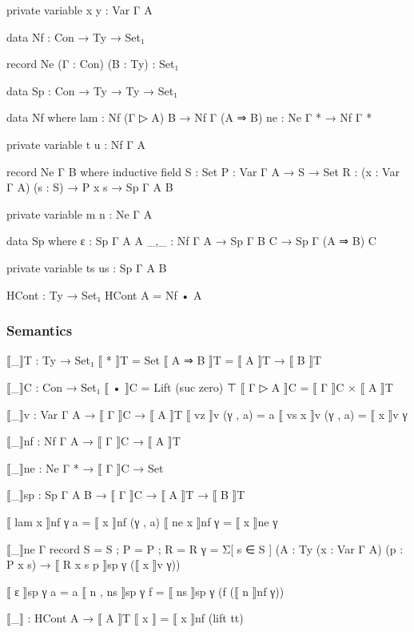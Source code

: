 \begin{code}[hide]
private variable x y : Var Γ A
\end{code}

\begin{code}
data Nf : Con → Ty → Set₁

record Ne (Γ : Con) (B : Ty) : Set₁

data Sp : Con → Ty → Ty → Set₁

data Nf where
  lam : Nf (Γ ▷ A) B → Nf Γ (A ⇒ B)
  ne  : Ne Γ * → Nf Γ *
\end{code}

\begin{code}[hide]
private variable t u : Nf Γ A
\end{code}

\begin{code}
record Ne Γ B where
  inductive
  field
    S : Set
    P : Var Γ A → S → Set
    R : (x : Var Γ A) (s : S) → P x s → Sp Γ A B
\end{code}

\begin{code}[hide]
private variable m n : Ne Γ A
\end{code}

\begin{code}
data Sp where
  ε   : Sp Γ A A
  _,_ : Nf Γ A → Sp Γ B C → Sp Γ (A ⇒ B) C
\end{code}

\begin{code}[hide]
private variable ts us : Sp Γ A B
\end{code}

\begin{code}
HCont : Ty → Set₁
HCont A = Nf • A
\end{code}

\subsubsection*{Semantics}

\begin{code}
⟦_⟧T : Ty → Set₁
⟦ * ⟧T = Set
⟦ A ⇒ B ⟧T = ⟦ A ⟧T → ⟦ B ⟧T

⟦_⟧C : Con → Set₁
⟦ • ⟧C = Lift (suc zero) ⊤
⟦ Γ ▷ A ⟧C = ⟦ Γ ⟧C × ⟦ A ⟧T

⟦_⟧v : Var Γ A → ⟦ Γ ⟧C → ⟦ A ⟧T
⟦ vz ⟧v (γ , a) = a
⟦ vs x ⟧v (γ , a) = ⟦ x ⟧v γ

⟦_⟧nf : Nf Γ A → ⟦ Γ ⟧C → ⟦ A ⟧T

⟦_⟧ne : Ne Γ * → ⟦ Γ ⟧C → Set

⟦_⟧sp : Sp Γ A B → ⟦ Γ ⟧C → ⟦ A ⟧T → ⟦ B ⟧T

⟦ lam x ⟧nf γ a = ⟦ x ⟧nf (γ , a)
⟦ ne x ⟧nf γ = ⟦ x ⟧ne γ

⟦_⟧ne {Γ} record { S = S ; P = P ; R = R } γ =
  Σ[ s ∈ S ] ({A : Ty} (x : Var Γ A) (p : P x s) → ⟦ R x s p ⟧sp γ (⟦ x ⟧v γ))

⟦ ε ⟧sp γ a = a
⟦ n , ns ⟧sp γ f = ⟦ ns ⟧sp γ (f (⟦ n ⟧nf γ))

⟦_⟧ : HCont A → ⟦ A ⟧T
⟦ x ⟧ = ⟦ x ⟧nf (lift tt)
\end{code}


